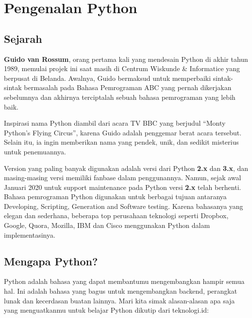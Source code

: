 \documentclass[
]{docs}
\begin{document}
\hypertarget{pengenalan-python}{%
\section{Pengenalan Python}\label{pengenalan-python}}

\hypertarget{sejarah}{%
\subsection{Sejarah}\label{sejarah}}

\textbf{Guido van Rossum}, orang pertama kali yang mendesain Python di akhir tahun 1989, memulai projek ini saat masih di Centrum Wiskunde \& Informatice yang berpusat di Belanda. Awalnya, Guido bermaksud untuk memperbaiki sintak-sintak bermasalah pada Bahasa Pemrograman ABC yang pernah dikerjakan sebelumnya dan akhirnya terciptalah sebuah bahasa pemrograman yang lebih baik.

Inspirasi nama Python diambil dari acara TV BBC yang berjudul ``Monty Python's Flying Circus'', karena Guido adalah penggemar berat acara tersebut. Selain itu, ia ingin memberikan nama yang pendek, unik, dan sedikit misterius untuk penemuannya.

Version yang paling banyak digunakan adalah versi dari Python \textbf{2.x} dan \textbf{3.x}, dan masing-masing versi memiliki fanbase dalam penggunannya. Namun, sejak awal Januari 2020 untuk support maintenance pada Python versi \textbf{2.x} telah berhenti. Bahasa pemrograman Python digunakan untuk berbagai tujuan antaranya Developing, Scripting, Generation and Software testing. Karena bahasanya yang elegan dan sederhana, beberapa top perusahaan teknologi seperti Dropbox, Google, Quora, Mozilla, IBM dan Cisco menggunakan Python dalam implementasinya.

\hypertarget{mengapa-python}{%
\subsection{Mengapa Python?}\label{mengapa-python}}

Python adalah bahasa yang dapat membantumu mengembangkan hampir semua hal. Ini adalah bahasa yang bagus untuk mengembangkan backend, perangkat lunak dan kecerdasan buatan lainnya. Mari kita simak alasan-alasan apa saja yang menguatkanmu untuk belajar Python dikutip dari teknologi.id:
\end{document}
